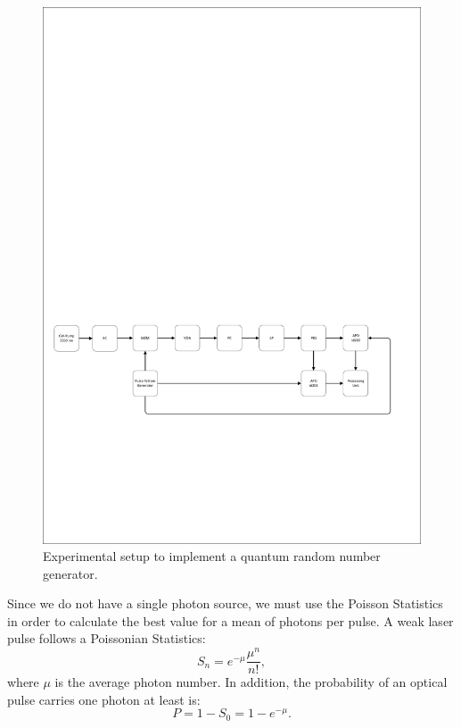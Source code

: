 \begin{figure}[H]
    \centering
        \includegraphics[clip, trim=0.5cm 7cm 0.5cm 17cm, width=1.00\textwidth]{./sdf/qrng/figures_raw/experimental_qrng.pdf}
    \caption{Experimental setup to implement a quantum random number generator.}\label{experimental_qrng}
\end{figure}

Since we do not have a single photon source, we must use the Poisson Statistics in order to calculate the best value for a mean of photons per pulse. A weak laser pulse follows a Poissonian Statistics\cite{markfox}:
\begin{equation}\label{eq:poisson}
  S_n = e^{-\mu}\frac{\mu^{n}}{n!},
\end{equation}
where $\mu$ is the average photon number. In addition, the probability of an optical pulse carries one photon at least is:
\begin{equation}\label{eq:prob1photon}
  P = 1 - S_0 = 1 - e^{-\mu}.
\end{equation}

